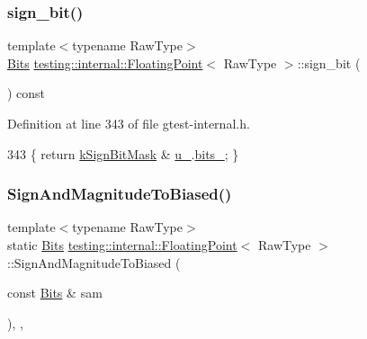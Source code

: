 \subsubsection{\texorpdfstring{sign\+\_\+bit()}{sign\_bit()}}
{\footnotesize\ttfamily template$<$typename Raw\+Type$>$ \\
\hyperlink{classtesting_1_1internal_1_1FloatingPoint_abf228bf6cd48f12c8b44c85b4971a731}{Bits} \hyperlink{classtesting_1_1internal_1_1FloatingPoint}{testing\+::internal\+::\+Floating\+Point}$<$ Raw\+Type $>$\+::sign\+\_\+bit (\begin{DoxyParamCaption}{ }\end{DoxyParamCaption}) const\hspace{0.3cm}{\ttfamily [inline]}}



Definition at line 343 of file gtest-\/internal.\+h.


\begin{DoxyCode}
343 \{ \textcolor{keywordflow}{return} \hyperlink{classtesting_1_1internal_1_1FloatingPoint_aca98b5ea6f2222a66a82e52421682efa}{kSignBitMask} & \hyperlink{classtesting_1_1internal_1_1FloatingPoint_a2e0b6bd427248b91476f3fca281f7104}{u\_}.\hyperlink{uniontesting_1_1internal_1_1FloatingPoint_1_1FloatingPointUnion_aedb69e386f5d624a016f7a781302a2bf}{bits\_}; \}
\end{DoxyCode}
\mbox{\label{classtesting_1_1internal_1_1FloatingPoint_a2cf0e39c6ebf026bc0353100d031ca85}} 
\subsubsection{\texorpdfstring{Sign\+And\+Magnitude\+To\+Biased()}{SignAndMagnitudeToBiased()}}
{\footnotesize\ttfamily template$<$typename Raw\+Type$>$ \\
static \hyperlink{classtesting_1_1internal_1_1FloatingPoint_abf228bf6cd48f12c8b44c85b4971a731}{Bits} \hyperlink{classtesting_1_1internal_1_1FloatingPoint}{testing\+::internal\+::\+Floating\+Point}$<$ Raw\+Type $>$\+::Sign\+And\+Magnitude\+To\+Biased (\begin{DoxyParamCaption}\item[{const \hyperlink{classtesting_1_1internal_1_1FloatingPoint_abf228bf6cd48f12c8b44c85b4971a731}{Bits} \&}]{sam }\end{DoxyParamCaption})\hspace{0.3cm}{\ttfamily [inline]}, {\ttfamily [static]}, {\ttfamily [private]}}



